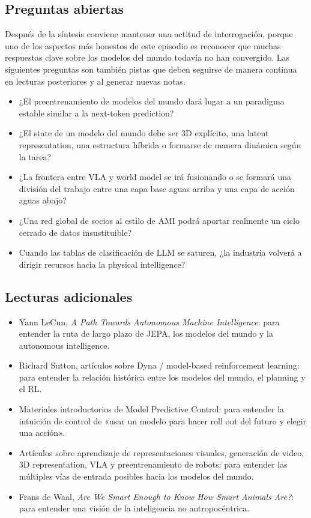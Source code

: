 \subsection{Preguntas abiertas}

Después de la síntesis conviene mantener una actitud de interrogación, porque uno de los aspectos más honestos de este episodio es reconocer que muchas respuestas clave sobre los modelos del mundo todavía no han convergido. Las siguientes preguntas son también pistas que deben seguirse de manera continua en lecturas posteriores y al generar nuevas notas.

\begin{itemize}
\item ¿El preentrenamiento de modelos del mundo dará lugar a un paradigma estable similar a la next-token prediction?
\item ¿El state de un modelo del mundo debe ser 3D explícito, una latent representation, una estructura híbrida o formarse de manera dinámica según la tarea?
\item ¿La frontera entre VLA y world model se irá fusionando o se formará una división del trabajo entre una capa base aguas arriba y una capa de acción aguas abajo?
\item ¿Una red global de socios al estilo de AMI podrá aportar realmente un ciclo cerrado de datos insustituible?
\item Cuando las tablas de clasificación de LLM se saturen, ¿la industria volverá a dirigir recursos hacia la physical intelligence?
\end{itemize}

\subsection{Lecturas adicionales}

\begin{itemize}
\item Yann LeCun, \textit{A Path Towards Autonomous Machine Intelligence}: para entender la ruta de largo plazo de JEPA, los modelos del mundo y la autonomous intelligence.
\item Richard Sutton, artículos sobre Dyna / model-based reinforcement learning: para entender la relación histórica entre los modelos del mundo, el planning y el RL.
\item Materiales introductorios de Model Predictive Control: para entender la intuición de control de «usar un modelo para hacer roll out del futuro y elegir una acción».
\item Artículos sobre aprendizaje de representaciones visuales, generación de video, 3D representation, VLA y preentrenamiento de robots: para entender las múltiples vías de entrada posibles hacia los modelos del mundo.
\item Frans de Waal, \textit{Are We Smart Enough to Know How Smart Animals Are?}: para entender una visión de la inteligencia no antropocéntrica.
\end{itemize}

